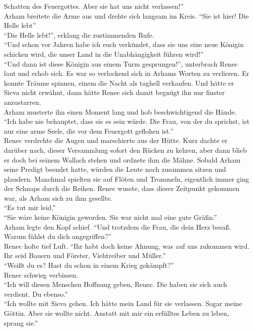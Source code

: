 Schatten des Feuergottes. Aber sie hat uns nicht verlassen!''\\
Arham breitete die Arme aus und drehte sich langsam im Kreis. ``Sie ist hier! Die Helle lebt''\\
``Die Helle lebt!'', erklang die zustimmenden Rufe.\\
``Und schon vor Jahren habe ich euch verkündet, dass sie uns eine neue Königin schicken wird, die 
unser Land in die Unabhängigkeit führen wird!''\\
``Und dann ist diese Königin aus einem Turm gesprungen!'', unterbrach Renec laut und erhob sich. Es 
war so verlockend sich in Arhams Worten zu verlieren. Er konnte Träume spinnen, einem die Nacht als 
taghell verkaufen. Und hätte er Sieva nicht erwähnt, dann hätte Renec sich damit begnügt ihn nur 
finster anzustarren.\\
Arham musterte ihn einen Moment lang und hob beschwichtigend die Hände. ``Ich habe nie behauptet, 
dass sie es sein würde. Die Frau, von der du sprichst, ist nur eine arme Seele, die vor dem 
Feuergott geflohen ist.''\\
Renec verdrehte die Augen und marschierte aus der Hütte. Kurz dachte er darüber nach, dieser 
Versammlung sofort den Rücken zu kehren, aber dann blieb er doch bei seinem Wallach stehen und 
ordnete ihm die Mähne. Sobald Arham seine Predigt beendet hatte, würden die Leute noch zusammen 
sitzen und plaudern. Manchmal spielten sie auf Flöten und Trommeln, eigentlich immer ging der 
Schnaps durch die Reihen. Renec wusste, dass dieser Zeitpunkt gekommen war, als Arham sich zu ihm 
gesellte.\\
``Es tut mir leid.''\\
``Sie wäre keine Königin geworden. Sie war nicht mal eine gute Gräfin.''\\
Arham legte den Kopf schief. ``Und trotzdem die Frau, die dein Herz besaß. Warum fühlst du dich 
angegriffen?''\\
Renec holte tief Luft. ``Ihr habt doch keine Ahnung, was auf uns zukommen wird. Ihr seid Bauern 
und Förster, Viehtreiber und Müller.''\\
``Weißt du es? Hast du schon in einem Krieg gekämpft?''\\
Renec schwieg verbissen.\\
``Ich will diesen Menschen Hoffnung geben, Renec. Die haben sie sich auch verdient. Du ebenso.''\\
``Ich wollte mit Sieva gehen. Ich hätte mein Land für sie verlassen. Sogar meine Göttin. Aber sie 
wollte nicht. Anstatt mit mir ein erfülltes Leben zu leben, sprang sie.''\\
